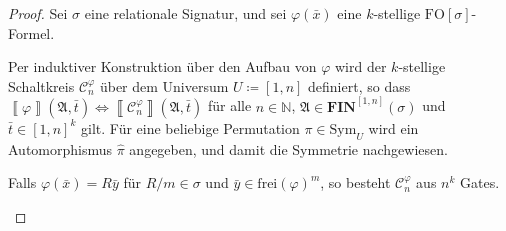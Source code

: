 \begin{proof}
Sei $\sigma$ eine relationale Signatur, und sei $\varphi\left(\bar{x}\right)$
eine $k$-stellige $\mathrm{FO}\left[\sigma\right]$-Formel.

Per induktiver Konstruktion über den Aufbau von $\varphi$ wird der
$k$-stellige Schaltkreis $\mathcal{C}_{n}^{\varphi}$ über dem Universum
$U\coloneqq\left[1,n\right]$ definiert, so dass $\left\llbracket \varphi\right\rrbracket \left(\mathfrak{A},\bar{t}\right)\Leftrightarrow\left\llbracket \mathcal{C}_{n}^{\varphi}\right\rrbracket \left(\mathfrak{A},\bar{t}\right)$
für alle $n\in\mathbb{N}$, $\mathfrak{A}\in\mathbf{FIN}^{\left[1,n\right]}\left(\sigma\right)$
und $\bar{t}\in\left[1,n\right]^{k}$ gilt. Für eine beliebige Permutation
$\pi\in\mathrm{Sym}_{U}$ wird ein Automorphismus $\hat{\pi}$ angegeben,
und damit die Symmetrie nachgewiesen.

\begin{casenv}
\item Falls $\varphi\left(\bar{x}\right)=R\bar{y}$ für $R/m\in\sigma$
und $\bar{y}\in\mathrm{frei}\left(\varphi\right)^{m}$, so besteht
$\mathcal{C}_{n}^{\varphi}$ aus $n^{k}$ Gates.


\end{casenv}
\end{proof}
